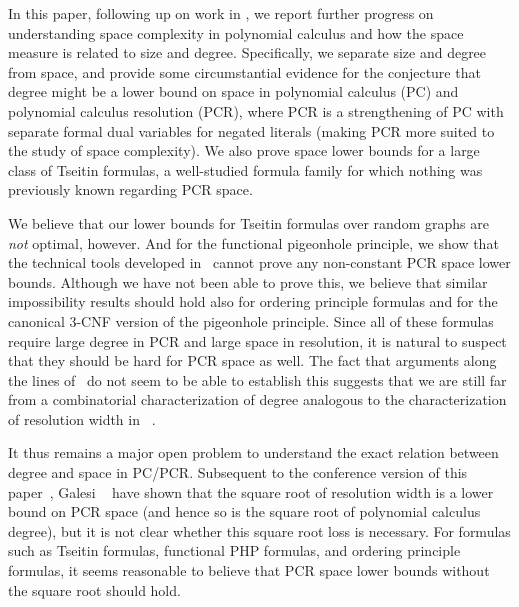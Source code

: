 \documentclass{toc}
\begin{document}
In this paper, following up on 
%
work in
\cite{BNT13SomeTradeoffs,BG15Framework,FLNRT15SpaceCplx,HN12VirtueSuccinctProofs},
we report further progress on understanding space complexity in
polynomial calculus and how the space measure is related to size and degree.
Specifically, we separate size and degree from
space, and provide some circumstantial evidence for the conjecture
that degree might be a lower bound on space in 
%
polynomial calculus (PC) and polynomial calculus resolution (PCR),
where PCR is a strengthening of PC with separate formal dual variables
for negated literals (making PCR more suited to the
study of space complexity).
We also prove space lower bounds for a large class of Tseitin
formulas, a well-studied formula family for which nothing was
previously known regarding PCR space.

We 
%
believe that our lower bounds for Tseitin formulas
over random graphs are \emph{not} optimal, however. And for the
functional pigeonhole principle, we show that the technical tools
developed in~%
\cite{BG15Framework}
cannot prove any non-constant PCR space lower bounds. Although we have
not been able to prove this, we believe that similar impossibility
results should hold also for ordering principle formulas and for the
canonical \mbox{$3$-CNF} version of the pigeonhole principle.
Since all of these formulas require large degree in PCR
and large space in resolution, it is natural to suspect that
they should be hard for PCR space as well.
The fact that arguments along the lines of~%
\cite{BG15Framework}
do not seem to be able to establish this suggests that we are still
far from a combinatorial characterization of degree analogous to
the characterization of resolution width 
in~%
\cite{AD08CombinatoricalCharacterization}.

It thus remains a major open problem to understand the exact
relation between degree and space in PC/PCR.
Subsequent to the conference version of this
paper~\cite{conf-version}, %
Galesi \etal~\cite{GKT19SpaceWidth} have shown that
%
%
%
the square root of resolution width %
is a lower bound on PCR space %
(and hence so is the square root of polynomial calculus degree), %
but it is not clear whether this square root loss is necessary.
For formulas such as Tseitin formulas, functional PHP formulas, and
ordering principle formulas, it seems reasonable to believe that PCR space
lower bounds without the square root should hold.
\end{document}
